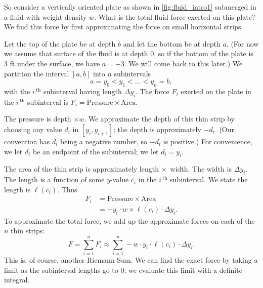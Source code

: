 
So consider a vertically oriented plate as shown in \autoref{fig:fluid_intro1} submerged in a fluid with weight-density $w$. What is the total fluid force exerted on this plate? We find this force by first approximating the force on small horizontal strips.

Let the top of the plate be at depth $b$ and let the bottom be at depth $a$. (For now we assume that surface of the fluid is at depth 0, so if the bottom of the plate is 3 ft under the surface, we have $a=-3$. We will come back to this later.) We partition the interval $[a,b]$ into $n$ subintervals 
\[a=y_0<y_1<\dotso<y_n=b,\]
with the $i\,^\text{th}$ subinterval having length $\Delta y_i$. The force $F_i$ exerted on the plate in the $i\,^\text{th}$ subinterval is $F_i = \text{Pressure}\times \text{Area}.$

The pressure is depth $\times w$. We approximate the depth of this thin strip by choosing any value $d_i$ in $[y_i,y_{i+1}]$; the depth is approximately $-d_i$. (Our convention has $d_i$ being a negative number, so $-d_i$ is positive.) For convenience, we let $d_i$ be an endpoint of the subinterval; we let $d_i = y_i$. 

The area of the thin strip is approximately length $\times$\ width. The width is $\Delta y_i$. The length is a function of some $y$-value $c_i$ in the $i\,^\text{th}$ subinterval. We state the length is $\ell(c_i)$. Thus 
\begin{align*}
	F_i	&= \text{Pressure} \times \text{Area} \\
		&=	-y_i\cdot w \times \ell(c_i)\cdot\Delta y_i.
\end{align*}
To approximate the total force, we add up the approximate forces on each of the $n$ thin strips:
\[
F = \sum_{i=1}^n F_i \approx \sum_{i=1}^n -w\cdot y_i\cdot\ell(c_i)\cdot\Delta y_i.
\]
This is, of course, another Riemann Sum. We can find the exact force by taking a limit as the subinterval lengths go to 0; we evaluate this limit with a definite integral.

